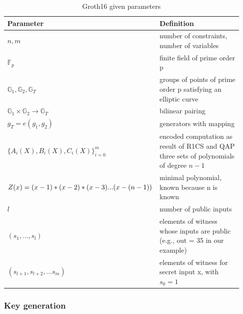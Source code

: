 \setlength{\tabcolsep}{2ex}
\renewcommand{\arraystretch}{1.5}%
\begin{table}[hbt]
	\centering
	    \caption{Groth16 given parameters}
		\begin{tabular}{| m{0.35\linewidth} | m{0.6\linewidth} |}
		\hline
		\textbf{Parameter} & \textbf{Definition}\\ \hline
            \(n,m\) & number of constraints, number of variables\\ \hline
            \begin{math}\mathbb{F}_p\end{math} & finite field of prime order p\\ \hline 
            \begin{math}\mathbb{G}_1, \mathbb{G}_2, \mathbb{G}_T\end{math} & groups of points of prime order p satisfying an elliptic curve\\ \hline
            \begin{math}\mathbb{G}_1 \times \mathbb{G}_2 \to \mathbb{G}_T\end{math}& bilinear pairing \\ \hline
            \begin{math}g_T = e(g_1, g_2)\end{math}& generators with mapping \\\hline
            \begin{math}\bigl\{A_i(X), B_i(X), C_i(X)\bigl\}_{i=0}^m\end{math} & encoded computation as result of R1CS and QAP three sets of polynomials of degree \(n-1\)\\ \hline
            \(Z(x) = (x-1)*(x-2) * \newline (x-3)...(x-(n-1))\) &  minimal polynomial, known because n is known \\ \hline
            \(l\) & number of public inputs \\ \hline
            \((s_1,...,s_l)\) & elements of witness whose inputs are public \newline (e.g., out = 35 in our example) \\ \hline
            \((s_{l+1},s_{l+2},...s_m)\) & elements of witness for secret input x, with \(s_0 = 1\) \\ \hline
	\end{tabular}
\label{tab:Groth16Params}
\end{table}

\subsubsection{Key generation}

